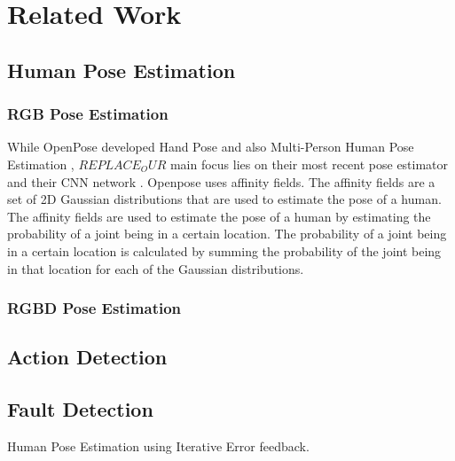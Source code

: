 \section{Related Work}
\label{sec:related_work}
\subsection{Human Pose Estimation}


\subsubsection{RGB Pose Estimation}

While OpenPose developed Hand Pose\cite{OpenPoseHand} and also Multi-Person Human Pose Estimation \cite{OpenPoseMulti}, $REPLACE_OUR$ main focus lies on their most recent pose estimator \cite{OpenPosePose} and their CNN network \cite{OpenPoseCNN}. Openpose uses affinity fields. The affinity fields are a set of 2D Gaussian distributions that are used to estimate the pose of a human. The affinity fields are used to estimate the pose of a human by estimating the probability of a joint being in a certain location. The probability of a joint being in a certain location is calculated by summing the probability of the joint being in that location for each of the Gaussian distributions.

\subsubsection{RGBD Pose Estimation}

\subsection{Action Detection}

\subsection{Fault Detection}

Human Pose Estimation using Iterative Error feedback. \cite{IterativeErrorFeedback}




